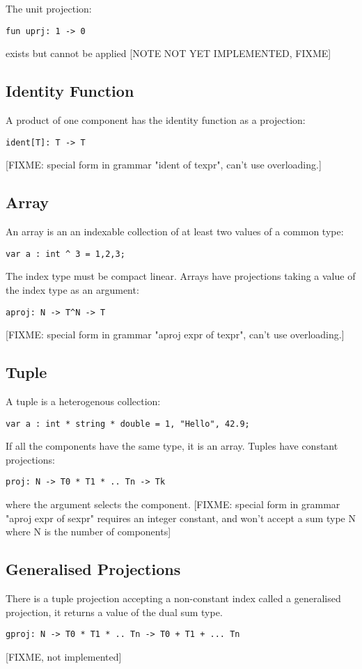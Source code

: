 \documentclass[oneside]{book}
\begin{document}
The unit projection:
\begin{verbatim}
fun uprj: 1 -> 0
\end{verbatim}
exists but cannot be applied [NOTE NOT YET IMPLEMENTED, FIXME]

\subsection{Identity Function}
A product of one component has the identity function as a projection:
\begin{verbatim}
ident[T]: T -> T
\end{verbatim}
[FIXME: special form in grammar "ident of texpr", can't use overloading.]
 
\subsection{Array}
An array is an an indexable collection of at least two values of a common type:
\begin{verbatim}
var a : int ^ 3 = 1,2,3;
\end{verbatim}
The index type must be compact linear. Arrays have projections
taking a value of the index type as an argument:
\begin{verbatim}
aproj: N -> T^N -> T
\end{verbatim}
[FIXME: special form in grammar "aproj expr of texpr", can't use overloading.]

\subsection{Tuple}
A tuple is a heterogenous collection:
\begin{verbatim}
var a : int * string * double = 1, "Hello", 42.9;
\end{verbatim}
If all the components have the same type, it is an array.
Tuples have constant projections:
\begin{verbatim}
proj: N -> T0 * T1 * .. Tn -> Tk
\end{verbatim}
where the argument selects the component.
[FIXME: special form in grammar "aproj expr of sexpr" requires an integer
constant, and won't accept a sum type N where N is the number of components]

\subsection{Generalised Projections}
There is a tuple projection accepting a non-constant index
called a generalised projection, it returns a value of the dual sum type.
\begin{verbatim}
gproj: N -> T0 * T1 * .. Tn -> T0 + T1 + ... Tn
\end{verbatim}
[FIXME, not implemented]
\end{document}
